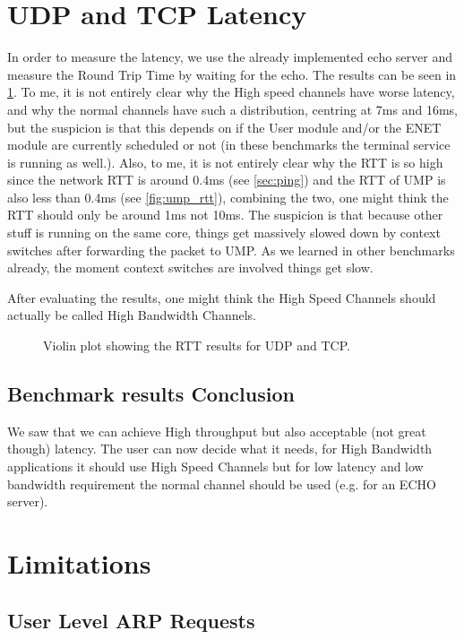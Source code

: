 \section{UDP and TCP Latency}
In order to measure the latency, we use the already implemented echo server and measure the Round Trip Time by waiting for the echo. The results can be seen in \ref{fig:net_lat}. To me, it is not entirely clear why the High speed channels have worse latency, and why the normal channels have such a distribution, centring at 7ms and 16ms, but the suspicion is that this depends on if the User module and/or the ENET module are currently scheduled or not (in these benchmarks the terminal service is running as well.). Also, to me, it is not entirely clear why the RTT is so high since the network RTT is around 0.4ms (see \ref{sec:ping}) and the RTT of UMP is also less than 0.4ms (see \ref{fig:ump_rtt}), combining the two, one might think the RTT should only be around 1ms not 10ms.
The suspicion is that because other stuff is running on the same core, things get massively slowed down by context switches after forwarding the packet to UMP. 
As we learned in other benchmarks already, the moment context switches are involved things get slow.


After evaluating the results, one might think the High Speed Channels should actually be called High Bandwidth Channels.

\begin{figure}[ht]
    \centering
    \scalebox{0.7}{ }

    \caption{Violin plot showing the RTT results for UDP and TCP.}
    \label{fig:net_lat}
\end{figure}


\subsection{Benchmark results Conclusion}
We saw that we can achieve High throughput but also acceptable (not great though) latency. The user can now decide what it needs, for High Bandwidth applications it should use High Speed Channels but for low latency and low bandwidth requirement the normal channel should be used (e.g. for an ECHO server).


\section{Limitations}

\subsection{User Level ARP Requests}

